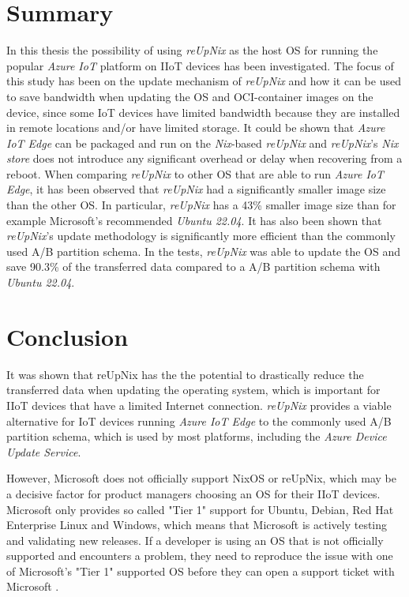 \section{Summary}
In this thesis the possibility of using \textit{reUpNix} as the host \ac{OS} for
running the popular \textit{Azure IoT} platform on \ac{IIoT} devices has been investigated.
The focus of this study has been on the update mechanism of \textit{reUpNix} and how it can be used
to save bandwidth when updating the \ac{OS} and \ac{OCI}-container images on the device,
since some \ac{IoT} devices have limited bandwidth because they are installed in
remote locations and/or have limited storage. It could be shown that \textit{Azure IoT Edge}
can be packaged and run on the \textit{Nix}-based \textit{reUpNix} and
\textit{reUpNix}'s \textit{Nix store} does not introduce any significant overhead
or delay when recovering from a reboot. When comparing \textit{reUpNix} to
other \ac{OS} that are able to run \textit{Azure IoT Edge}, it has been observed that \textit{reUpNix}
had a significantly smaller image size than the other \ac{OS}. In particular,
\textit{reUpNix} has a 43\% smaller image size than for example Microsoft's
recommended \textit{Ubuntu 22.04}. It has also been shown that \textit{reUpNix}'s update
methodology is significantly more efficient than the commonly used A/B partition
schema. In the tests, \textit{reUpNix} was able to update the \ac{OS} and save
90.3\% of the transferred data compared to a A/B partition schema with \textit{Ubuntu 22.04}.


\section{Conclusion}
It was shown that reUpNix has the the potential to drastically reduce the transferred
data when updating the operating system, which is important for \ac{IIoT} devices
that have a limited Internet connection. \textit{reUpNix} provides a viable
alternative for \ac{IoT} devices running \textit{Azure IoT Edge}
to the commonly used A/B partition schema, which is used by most platforms,
including the \textit{Azure Device Update Service}.

However, Microsoft does not officially support NixOS or reUpNix, which may be a decisive factor
for product managers choosing an \ac{OS} for their \ac{IIoT} devices. Microsoft
only provides so called "Tier 1" support for Ubuntu, Debian, Red Hat Enterprise
Linux and Windows, which means that Microsoft is actively testing and validating
new releases. If a developer is using an \ac{OS} that is not officially supported
and encounters a problem, they need to reproduce the issue with one of Microsoft's
"Tier 1" supported \ac{OS} before they can open a support ticket with Microsoft
\cite{msdoc-supportetplatforms}.


